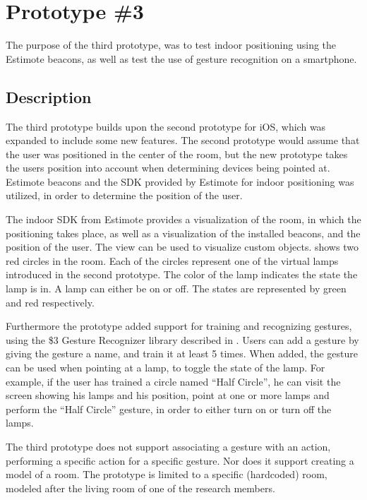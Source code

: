 \section{Prototype \#3}
\label{sec:implementation:prototypes:prototype3}

The purpose of the third prototype, 
was to test indoor positioning using the Estimote beacons, 
as well as test the use of gesture recognition on a smartphone.

\subsection{Description}
The third prototype builds upon the second prototype for iOS, 
which was expanded to include some new features. 
The second prototype would assume that the user was positioned in the center of the room, 
but the new prototype takes the users position into account when determining devices being pointed at. 
Estimote beacons and the SDK provided by Estimote for indoor positioning was utilized, 
in order to determine the position of the user.

The indoor SDK from Estimote provides a visualization of the room, 
in which the positioning takes place, 
as well as a visualization of the installed beacons, 
and the position of the user. 
The view can be used to visualize custom objects. 
 shows two red circles in the room. 
Each of the circles represent one of the virtual lamps introduced in the second prototype. 
The color of the lamp indicates the state the lamp is in. 
A lamp can either be on or off. 
The states are represented by green and red respectively.

Furthermore the prototype added support for training and recognizing gestures, 
using the \$3 Gesture Recognizer library described in .
Users can add a gesture by giving the gesture a name, 
and train it at least \num{5} times. 
When added, the gesture can be used when pointing at a lamp, 
to toggle the state of the lamp. 
For example, if the user has trained a circle named ``Half Circle'', 
he can visit the screen showing his lamps and his position, 
point at one or more lamps and perform the ``Half Circle'' gesture, 
in order to either turn on or turn off the lamps.

The third prototype does not support associating a gesture with an action, 
\ie performing a specific action for a specific gesture. 
Nor does it support creating a model of a room. 
The prototype is limited to a specific (hardcoded) room,
modeled after the living room of one of the research members.

